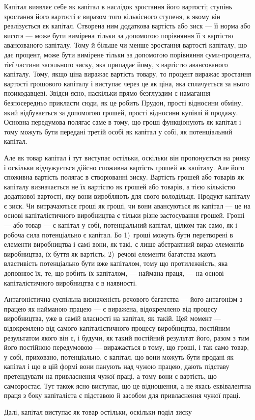 Капітал виявляє себе як капітал в наслідок зростання його
вартості; ступінь зростання його вартості є виразом того кількісного
ступеня, в якому він реалізується як капітал. Створена
ним додаткова вартість або зиск — її норма або висота — може
бути вимірена тільки за допомогою порівняння її з вартістю
авансованого капіталу. Тому й більше чи менше зростання вартості
капіталу, що дає процент, може бути вимірене тільки
за допомогою порівняння суми-процента, тієї частини загального
зиску, яка припадає йому, з вартістю авансованого капіталу. Тому,
якщо ціна виражає вартість товару, то процент виражає зростання
вартості грошового капіталу і виступає через це як ціна,
яка сплачується за нього позикодавцеві. Звідси ясно, наскільки
прямо безглуздим є намагання безпосередньо прикласти сюди, як
це робить Прудон, прості відносини обміну, який відбувається за
допомогою грошей, прості відносини купівлі й продажу. Основна
передумова полягає саме в тому, що гроші функціонують як
капітал і тому можуть бути передані третій особі як капітал у
собі, як потенціальний капітал.

Але як товар капітал і тут виступає остільки, оскільки він
пропонується на ринку і оскільки відчужується дійсно споживна
вартість грошей як капіталу. Але його споживна вартість полягає
в створюванні зиску. Вартість грошей або товарів як капіталу
визначається не їх вартістю як грошей або товарів, а тією
кількістю додаткової вартості, яку вони виробляють для свого
володільця. Продукт капіталу є зиск. Чи витрачаються гроші
як гроші, чи вони авансуються як капітал — це на основі капіталістичного
виробництва є тільки різне застосування грошей.
Гроші — або товар — є капітал у собі, потенціальний капітал, цілком
так само, як і робоча сила потенціально є капітал. Бо
1)~гроші можуть бути перетворені в елементи виробництва і самі
вони, як такі, є лише абстрактний вираз елементів виробництва,
їх буття як вартість; 2)~речові елементи багатства мають
властивість потенціально бути вже капіталом, тому що протилежність,
яка доповнює їх, те, що робить їх капіталом, — наймана
праця, — на основі капіталістичного виробництва є в наявності.

Антагоністична суспільна визначеність речового багатства —
його антагонізм з працею як найманою працею — є виражена,
відокремлено від процесу виробництва, уже в самій власності
на капітал, як такій. Цей момент — відокремлено від самого капіталістичного
процесу виробництва, постійним результатом якого
він є, і будучи, як такий постійний результат його, разом з тим
його постійною передумовою — виражається в тому, що гроші,
і так само товар, у собі, приховано, потенціально, є капітал, що
вони можуть бути продані як капітал і що в цій формі вони панують
над чужою працею, дають підставу претендувати на привласнення
чужої праці, а тому вони є вартість, що самозростає.
Тут також ясно виступає, що це відношення, а не якась еквівалентна
праця з боку капіталіста є підставою й засобом для привласнення
чужої праці.

Далі, капітал виступає як товар остільки, оскільки поділ зиску
\parbreak{}  %

